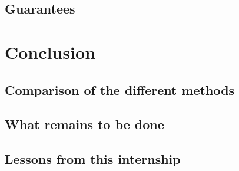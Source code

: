 \documentclass[11pt,a4paper,oldfontcommands,openany]{memoir}
\begin{document}

    \section{Guarantees}

\chapter{Conclusion}

    \section{Comparison of the different methods}


    \section{What remains to be done}


    \section{Lessons from this internship}




\end{document}
